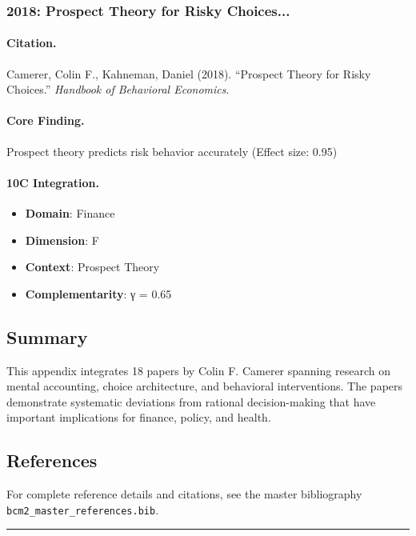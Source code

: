 \subsubsection{2018: Prospect Theory for Risky Choices...}

\paragraph{Citation.}
Camerer, Colin F., Kahneman, Daniel (2018). ``Prospect Theory for Risky Choices.''
\textit{Handbook of Behavioral Economics}.

\paragraph{Core Finding.}
Prospect theory predicts risk behavior accurately (Effect size: 0.95)

\paragraph{10C Integration.}
\begin{itemize}[nosep]
  \item \textbf{Domain}: Finance
  \item \textbf{Dimension}: F
  \item \textbf{Context}: Prospect Theory
  \item \textbf{Complementarity}: γ = 0.65
\end{itemize}

\subsection{Summary}

This appendix integrates 18 papers by Colin F. Camerer
spanning research on mental accounting, choice architecture, and behavioral
interventions. The papers demonstrate systematic deviations from rational
decision-making that have important implications for finance, policy, and health.

\subsection{References}

For complete reference details and citations, see the master bibliography
\texttt{bcm2\_master\_references.bib}.

\vspace{1em}
\hrule
\vspace{0.5em}

